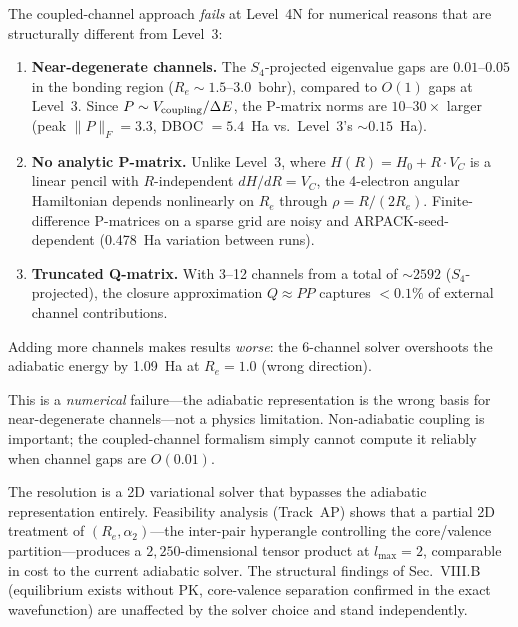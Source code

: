 \documentclass[aps,pra,twocolumn,superscriptaddress,longbibliography,floatfix]{revtex4-2}
\begin{document}
The coupled-channel approach \emph{fails} at Level~4N for numerical
reasons that are structurally different from Level~3:
\begin{enumerate}
  \item \textbf{Near-degenerate channels.}  The $S_4$-projected
    eigenvalue gaps are $0.01$--$0.05$ in the bonding region
    ($R_e \sim 1.5$--$3.0$~bohr), compared to $O(1)$ gaps at
    Level~3.  Since $P \sim V_{\rm coupling} / \Delta E$, the
    P-matrix norms are $10$--$30{\times}$ larger (peak
    $\|P\|_F = 3.3$, DBOC $= 5.4$~Ha vs.\ Level~3's $\sim 0.15$~Ha).
  \item \textbf{No analytic P-matrix.}  Unlike Level~3, where
    $H(R) = H_0 + R \cdot V_C$ is a linear pencil with
    $R$-independent $dH/dR = V_C$, the 4-electron angular
    Hamiltonian depends nonlinearly on $R_e$ through
    $\rho = R/(2R_e)$.  Finite-difference P-matrices on a sparse
    grid are noisy and ARPACK-seed-dependent (0.478~Ha variation
    between runs).
  \item \textbf{Truncated Q-matrix.}  With 3--12 channels from a
    total of ${\sim}2592$ ($S_4$-projected), the closure
    approximation $Q \approx PP$ captures $<0.1\%$ of external
    channel contributions.
\end{enumerate}
Adding more channels makes results \emph{worse}: the 6-channel
solver overshoots the adiabatic energy by 1.09~Ha at $R_e = 1.0$
(wrong direction).

This is a \emph{numerical} failure---the adiabatic representation is
the wrong basis for near-degenerate channels---not a physics
limitation.  Non-adiabatic coupling is important; the coupled-channel
formalism simply cannot compute it reliably when channel gaps are
$O(0.01)$.

The resolution is a 2D variational solver that bypasses the adiabatic
representation entirely.  Feasibility analysis (Track~AP) shows that
a partial 2D treatment of $(R_e, \alpha_2)$---the inter-pair
hyperangle controlling the core/valence partition---produces a
$2{,}250$-dimensional tensor product at $l_{\max} = 2$, comparable
in cost to the current adiabatic solver.  The structural findings of
Sec.~VIII.B (equilibrium exists without PK, core-valence separation
confirmed in the exact wavefunction) are unaffected by the solver
choice and stand independently.
\end{document}
